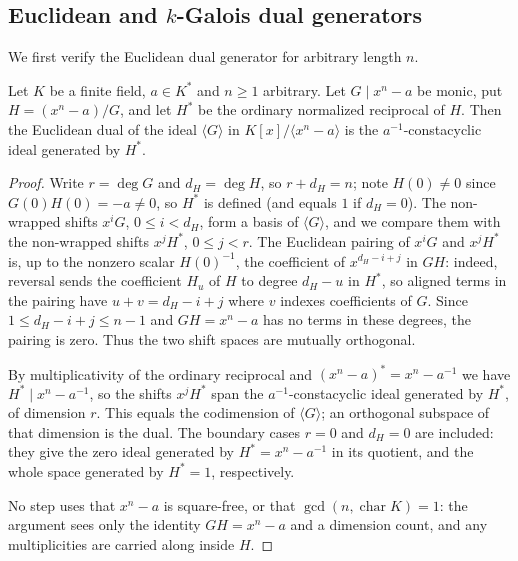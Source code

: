 \subsection{Euclidean and \texorpdfstring{$k$}{k}-Galois dual
generators}\label{sec:dual-generators}

We first verify the Euclidean dual generator for arbitrary length $n$.

\begin{lemma}\label{lem:euclidean-dual}
Let $K$ be a finite field, $a\in K^\ast$ and $n\geq1$ arbitrary.  Let
$G\mid x^n-a$ be monic, put $H=(x^n-a)/G$, and let $H^\ast$ be the ordinary
normalized reciprocal of $H$.  Then the Euclidean dual of the ideal
$\langle G\rangle$ in $K[x]/\langle x^n-a\rangle$ is the
$a^{-1}$-constacyclic ideal generated by $H^\ast$.
\end{lemma}

\begin{proof}
Write $r=\deg G$ and $d_H=\deg H$, so $r+d_H=n$; note $H(0)\neq0$ since
$G(0)H(0)=-a\neq0$, so $H^\ast$ is defined (and equals $1$ if $d_H=0$).  The
non-wrapped shifts $x^iG$, $0\leq i<d_H$, form a basis of $\langle G\rangle$,
and we compare them with the non-wrapped shifts $x^jH^\ast$, $0\leq j<r$.  The
Euclidean pairing of $x^iG$ and $x^jH^\ast$ is, up to the nonzero scalar
$H(0)^{-1}$, the coefficient of $x^{d_H-i+j}$ in $GH$: indeed, reversal sends
the coefficient $H_u$ of $H$ to degree $d_H-u$ in $H^\ast$, so aligned terms in
the pairing have $u+v=d_H-i+j$ where $v$ indexes coefficients of $G$.  Since
$1\leq d_H-i+j\leq n-1$ and $GH=x^n-a$ has no terms in these degrees, the
pairing is zero.  Thus the two shift spaces are mutually orthogonal.

By multiplicativity of the ordinary reciprocal and
$(x^n-a)^\ast=x^n-a^{-1}$ we have $H^\ast\mid x^n-a^{-1}$, so the shifts
$x^jH^\ast$ span the $a^{-1}$-constacyclic ideal generated by $H^\ast$, of
dimension $r$.  This equals the codimension of $\langle G\rangle$; an
orthogonal subspace of that dimension is the dual.  The boundary cases
$r=0$ and $d_H=0$ are included: they give the zero ideal generated by
$H^\ast=x^n-a^{-1}$ in its quotient, and the whole space generated by
$H^\ast=1$, respectively.

No step uses that $x^n-a$ is square-free, or that $\gcd(n,\operatorname{char}K)=1$:
the argument sees only the identity $GH=x^n-a$ and a dimension count, and any
multiplicities are carried along inside $H$.
\end{proof}

